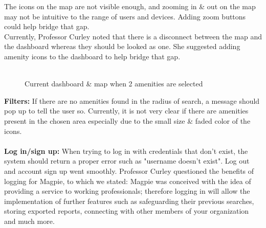 \documentclass{report}
\begin{document}
The icons on the map are not visible enough, and zooming in \& out on the map may not be intuitive to the range of users and devices. Adding zoom buttons could help bridge that gap. \\
Currently, Professor Curley noted that there is a disconnect between the map and the dashboard whereas they should be looked as one. She suggested adding amenity icons to the dashboard to help bridge that gap.\\ \\
\begin{figure}
    \caption{Current dashboard \& map when 2 amenities are selected}
    \label{fig:plot12}
\end{figure}
\textbf{Filters: }
If there are no amenities found in the radius of search, a message should pop up to tell the user so. Currently, it is not very clear if there are amenities present in the chosen area especially due to the small size \& faded color of the icons. \\ \\
\textbf{Log in/sign up: }
When trying to log in with credentials that don't exist, the system should return a proper error such as "username doesn't exist". Log out and account sign up went smoothly. Professor Curley questioned the benefits of logging for Magpie, to which we stated:
Magpie was conceived with the idea of providing a service to working professionals; therefore logging in will allow the implementation of further features such as safeguarding their previous searches, storing exported reports, connecting with other members of your organization and much more.\\ \\
\end{document}
